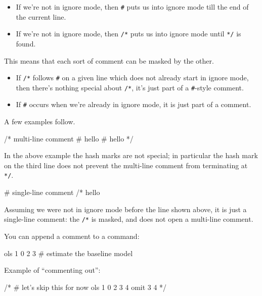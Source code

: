 \begin{itemize}
\item If we're not in ignore mode, then \texttt{\#} puts us into ignore
  mode till the end of the current line.
\item If we're not in ignore mode, then \texttt{/*} puts us into ignore
  mode until \texttt{*/} is found.
\end{itemize}

This means that each sort of comment can be masked by the other.  

\begin{itemize}
\item If \texttt{/*} follows \texttt{\#} on a given line which does
  not already start in ignore mode, then there's nothing special about
  \texttt{/*}, it's just part of a \texttt{\#}-style comment.
\item If \texttt{\#} occurs when we're already in ignore mode, it is
  just part of a comment.
\end{itemize}

A few examples follow.
%
\begin{code}
/* multi-line comment
   # hello
   # hello */
\end{code}
%
In the above example the hash marks are not special; in particular
the hash mark on the third line does not prevent the multi-line
comment from terminating at \texttt{*/}.
%
\begin{code}
# single-line comment /* hello
\end{code}
%
Assuming we were not in ignore mode before the line shown above, it is
just a single-line comment: the \texttt{/*} is masked, and does not
open a multi-line comment.

You can append a comment to a command:
%
\begin{code}
ols 1 0 2 3 # estimate the baseline model
\end{code}
%
Example of ``commenting out'':
%
\begin{code}
/*
# let's skip this for now
ols 1 0 2 3 4
omit 3 4
*/
\end{code}
%







